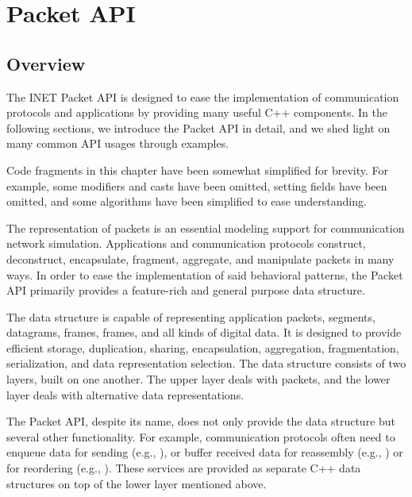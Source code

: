 \chapter{Packet API}
\label{cha:packet-api}

\section{Overview}

The INET Packet API is designed to ease the implementation of communication
protocols and applications by providing many useful C++ components. In the
following sections, we introduce the Packet API in detail, and we shed light on
many common API usages through examples.

\begin{note}
Code fragments in this chapter have been somewhat simplified for brevity. For
example, some  modifiers and  casts have been omitted,
setting fields have been omitted, and some algorithms have been simplified to
ease understanding.
\end{note}

The representation of packets is an essential modeling support for communication
network simulation. Applications and communication protocols construct,
deconstruct, encapsulate, fragment, aggregate, and manipulate packets in many
ways. In order to ease the implementation of said behavioral patterns, the
Packet API primarily provides a feature-rich and general purpose
 data structure.

The  data structure is capable of representing application
packets,  segments,  datagrams, 
frames,  frames, and all kinds of digital data. It is
designed to provide efficient storage, duplication, sharing, encapsulation,
aggregation, fragmentation, serialization, and data representation selection.
The  data structure consists of two layers, built on one
another. The upper layer deals with packets, and the lower layer deals with
alternative data representations.

The Packet API, despite its name, does not only provide the 
data structure but several other functionality. For example, communication
protocols often need to enqueue data for sending (e.g., ), or
buffer received data for reassembly (e.g., ) or for reordering
(e.g., ). These services are provided as separate C++ data
structures on top of the lower layer mentioned above.

